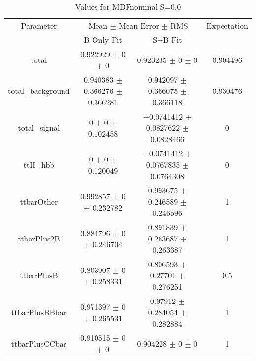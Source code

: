 \begin{table}
\centering
\caption{Values for MDFnominal S=0.0}
\begin{tabular}{cccc}
\toprule
Parameter & \multicolumn{2}{c}{Mean $\pm$ Mean Error $\pm$ RMS} & Expectation\\
 & B-Only Fit & S+B Fit & \\
\midrule
total & \num{0.922929} $\pm$ \num{0} $\pm$ \num{0} & \num{0.923235} $\pm$ \num{0} $\pm$ \num{0} & \num{0.904496}\\
total\_background & \num{0.940383} $\pm$ \num{0.366276} $\pm$ \num{0.366281} & \num{0.942097} $\pm$ \num{0.366075} $\pm$ \num{0.366118} & \num{0.930476}\\
total\_signal & \num{0} $\pm$ \num{0} $\pm$ \num{0.102458} & \num{-0.0741412} $\pm$ \num{0.0827622} $\pm$ \num{0.0828466} & \num{0}\\
ttH\_hbb & \num{0} $\pm$ \num{0} $\pm$ \num{0.120049} & \num{-0.0741412} $\pm$ \num{0.0767835} $\pm$ \num{0.0764308} & \num{0}\\
ttbarOther & \num{0.992857} $\pm$ \num{0} $\pm$ \num{0.232782} & \num{0.993675} $\pm$ \num{0.246589} $\pm$ \num{0.246596} & \num{1}\\
ttbarPlus2B & \num{0.884796} $\pm$ \num{0} $\pm$ \num{0.246704} & \num{0.891839} $\pm$ \num{0.263687} $\pm$ \num{0.263387} & \num{1}\\
ttbarPlusB & \num{0.803907} $\pm$ \num{0} $\pm$ \num{0.258331} & \num{0.806593} $\pm$ \num{0.27701} $\pm$ \num{0.276251} & \num{0.5}\\
ttbarPlusBBbar & \num{0.971397} $\pm$ \num{0} $\pm$ \num{0.265531} & \num{0.97912} $\pm$ \num{0.284054} $\pm$ \num{0.282884} & \num{1}\\
ttbarPlusCCbar & \num{0.910515} $\pm$ \num{0} $\pm$ \num{0} & \num{0.904228} $\pm$ \num{0} $\pm$ \num{0} & \num{1}\\
\bottomrule
\end{tabular}
\end{table}